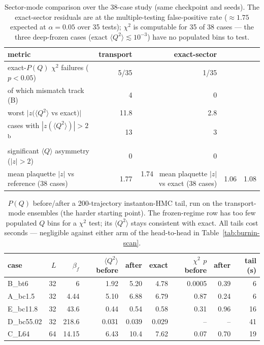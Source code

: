 \begin{table}[p]
  \centering
  \caption{Sector-mode comparison over the 38-case study (same checkpoint
  and seeds). The exact-sector residuals are at the multiple-testing
  false-positive rate (${\approx}1.75$ expected at $\alpha = 0.05$ over 35
  tests); $\chi^2$ is computable for 35 of 38 cases --- the three
  deep-frozen cases (exact $\langle Q^2 \rangle \lesssim 10^{-3}$) have no
  populated bins to test.}
  \label{tab:sector-modes}
  \begin{tabular}{lrr}
    \toprule
    metric & transport & exact-sector \\
    \midrule
    exact-$P(Q)$ $\chi^2$ failures ($p < 0.05$) & 5/35 & 1/35 \\
    \quad of which mismatch track (B)           & 4    & 0    \\
    worst $|z(\langle Q^2 \rangle$ vs exact$)|$ & 11.8 & 2.8  \\
    cases with $|z(\langle Q^2 \rangle)| > 2$\textsuperscript{b} & 13 & 3 \\
    significant $\langle Q \rangle$ asymmetry ($|z| > 2$) & 0 & 0 \\
    mean plaquette $|z|$ vs reference (38 cases) & 1.77 & 1.74 \
    mean plaquette $|z|$ vs exact (38 cases)     & 1.06 & 1.08 \\
    \bottomrule
  \end{tabular}
\end{table}

\begin{table}[p]
  \centering
  \caption{$P(Q)$ before/after a 200-trajectory instanton-HMC tail, run on
  the transport-mode ensembles (the harder starting point). The
  frozen-regime row has too few populated $Q$ bins for a $\chi^2$ test; its
  $\langle Q^2 \rangle$ stays consistent with exact. All tails cost
  seconds --- negligible against either arm of the head-to-head in
  Table~\ref{tab:burnin-scan}.}
  \label{tab:pq-tail}
  \begin{tabular}{lrrrrrrrr}
    \toprule
    case & $L$ & $\beta_f$ & $\langle Q^2 \rangle$ before & after & exact &
    $\chi^2$ $p$ before & after & tail (s) \\
    \midrule
    B\_bt6      & 32 & 6      & 1.92  & 5.20  & 4.78  & 0.0005 & 0.39 & 6  \\
    A\_bc1.5    & 32 & 4.44   & 5.10  & 6.88  & 6.79  & 0.87   & 0.24 & 6  \\
    E\_bc11.8   & 32 & 43.6   & 0.44  & 0.54  & 0.58  & 0.31   & 0.96 & 16 \\
    D\_bc55.02  & 32 & 218.6  & 0.031 & 0.039 & 0.029 & --     & --   & 41 \\
    C\_L64      & 64 & 14.15  & 6.43  & 10.4  & 7.62  & 0.07   & 0.70 & 19 \\
    \bottomrule
  \end{tabular}
\end{table}

